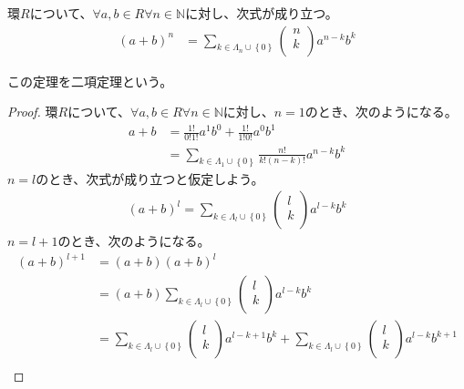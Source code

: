 \documentclass[dvipdfmx]{jsarticle}
\begin{document}
\begin{thm}[二項定理]\label{3.3.1.10}
環$R$について、$\forall a,b \in R\forall n \in \mathbb{N}$に対し、次式が成り立つ。
\begin{align*}
(a + b)^{n} &= \sum_{k \in \varLambda_{n} \cup \left\{ 0 \right\}} {\begin{pmatrix}
n \\
k \\
\end{pmatrix}a^{n - k}b^{k}}
\end{align*}\par
この定理を二項定理という。
\end{thm}
\begin{proof}
環$R$について、$\forall a,b \in R\forall n \in \mathbb{N}$に対し、$n = 1$のとき、次のようになる。
\begin{align*}
a + b &= \frac{1!}{0!1!}a^{1}b^{0} + \frac{1!}{1!0!}a^{0}b^{1}\\
&= \sum_{k \in \varLambda_{1} \cup \left\{ 0 \right\}} {\frac{n!}{k!(n - k)!}a^{n - k}b^{k}}
\end{align*}
$n = l$のとき、次式が成り立つと仮定しよう。
\begin{align*}
(a + b)^{l} = \sum_{k \in \varLambda_{l} \cup \left\{ 0 \right\}} {\begin{pmatrix}
l \\
k \\
\end{pmatrix}a^{l - k}b^{k}}
\end{align*}
$n = l + 1$のとき、次のようになる。
\begin{align*}
(a + b)^{l + 1} &= (a + b)(a + b)^{l}\\
&= (a + b)\sum_{k \in \varLambda_{l} \cup \left\{ 0 \right\}} {\begin{pmatrix}
l \\
k \\
\end{pmatrix}a^{l - k}b^{k}}\\
&= \sum_{k \in \varLambda_{l} \cup \left\{ 0 \right\}} {\begin{pmatrix}
l \\
k \\
\end{pmatrix}a^{l - k + 1}b^{k}} + \sum_{k \in \varLambda_{l} \cup \left\{ 0 \right\}} {\begin{pmatrix}
l \\
k \\
\end{pmatrix}a^{l - k}b^{k + 1}}\\

\end{align*}
\end{proof}
\end{document}

